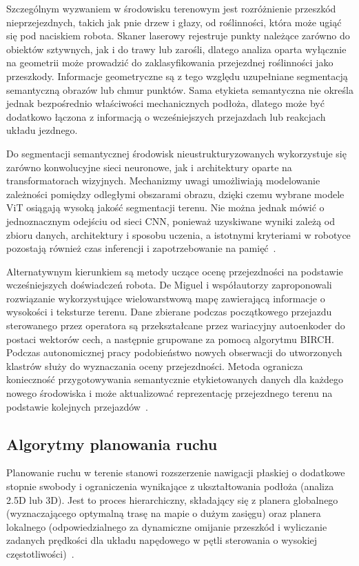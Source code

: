 \documentclass[a4paper,twoside,12pt]{book}
\begin{document}
Szczególnym wyzwaniem w środowisku terenowym jest rozróżnienie przeszkód nieprzejezdnych, takich jak pnie drzew i głazy, od roślinności, która może ugiąć się pod naciskiem robota. Skaner laserowy rejestruje punkty należące zarówno do obiektów sztywnych, jak i do trawy lub zarośli, dlatego analiza oparta wyłącznie na geometrii może prowadzić do zaklasyfikowania przejezdnej roślinności jako przeszkody. Informacje geometryczne są z tego względu uzupełniane segmentacją semantyczną obrazów lub chmur punktów. Sama etykieta semantyczna nie określa jednak bezpośrednio właściwości mechanicznych podłoża, dlatego może być dodatkowo łączona z informacją o wcześniejszych przejazdach lub reakcjach układu jezdnego.

Do segmentacji semantycznej środowisk nieustrukturyzowanych wykorzystuje się zarówno konwolucyjne sieci neuronowe, jak i architektury oparte na transformatorach wizyjnych. Mechanizmy uwagi umożliwiają modelowanie zależności pomiędzy odległymi obszarami obrazu, dzięki czemu wybrane modele ViT osiągają wysoką jakość segmentacji terenu. Nie można jednak mówić o jednoznacznym odejściu od sieci CNN, ponieważ uzyskiwane wyniki zależą od zbioru danych, architektury i sposobu uczenia, a istotnymi kryteriami w robotyce pozostają również czas inferencji i zapotrzebowanie na pamięć~\cite{li2023transformer}.

Alternatywnym kierunkiem są metody uczące ocenę przejezdności na podstawie wcześniejszych doświadczeń robota. De Miguel i współautorzy zaproponowali rozwiązanie wykorzystujące wielowarstwową mapę zawierającą informacje o wysokości i teksturze terenu. Dane zbierane podczas początkowego przejazdu sterowanego przez operatora są przekształcane przez wariacyjny autoenkoder do postaci wektorów cech, a następnie grupowane za pomocą algorytmu BIRCH. Podczas autonomicznej pracy podobieństwo nowych obserwacji do utworzonych klastrów służy do wyznaczania oceny przejezdności. Metoda ogranicza konieczność przygotowywania semantycznie etykietowanych danych dla każdego nowego środowiska i może aktualizować reprezentację przejezdnego terenu na podstawie kolejnych przejazdów~\cite{demiguel2025iilearnexperiencebased}.


\subsection{Algorytmy planowania ruchu}
Planowanie ruchu w terenie stanowi rozszerzenie nawigacji płaskiej o dodatkowe stopnie swobody i ograniczenia wynikające z ukształtowania podłoża (analiza 2.5D lub 3D). Jest to proces hierarchiczny, składający się z planera globalnego (wyznaczającego optymalną trasę na mapie o dużym zasięgu) oraz planera lokalnego (odpowiedzialnego za dynamiczne omijanie przeszkód i wyliczanie zadanych prędkości dla układu napędowego w pętli sterowania o wysokiej częstotliwości)~\cite{ZANG2025114055}. 
\end{document}
